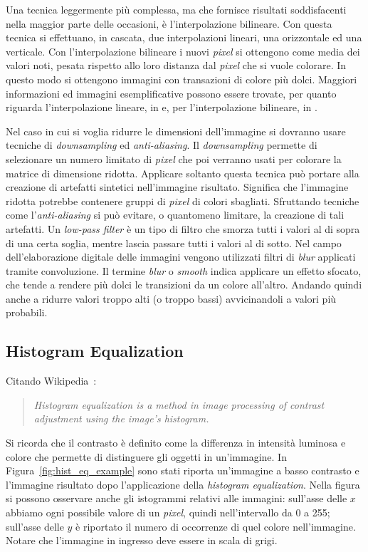 Una tecnica leggermente più complessa, ma che fornisce risultati soddisfacenti nella maggior parte delle occasioni, è l'interpolazione bilineare.
Con questa tecnica si effettuano, in cascata, due interpolazioni lineari, una orizzontale ed una verticale.
Con l'interpolazione bilineare i nuovi \textit{pixel} si ottengono come media dei valori noti, pesata rispetto allo loro distanza dal \textit{pixel} che si vuole colorare.
In questo modo si ottengono immagini con transazioni di colore più dolci.
Maggiori informazioni ed immagini esemplificative possono essere trovate, per quanto riguarda l'interpolazione lineare, in \cite{linear-interpolation} e, per l'interpolazione bilineare, in \cite{bilinear-interpolation}.

Nel caso in cui si voglia ridurre le dimensioni dell'immagine si dovranno usare tecniche di \textit{downsampling} ed \textit{anti-aliasing}.
Il \textit{downsampling} permette di selezionare un numero limitato di \textit{pixel} che poi verranno usati per colorare la matrice di dimensione ridotta.
Applicare soltanto questa tecnica può portare alla creazione di artefatti sintetici nell'immagine risultato.
Significa che l'immagine ridotta potrebbe contenere gruppi di \textit{pixel} di colori sbagliati.
Sfruttando tecniche come l'\textit{anti-aliasing} si può evitare, o quantomeno limitare, la creazione di tali artefatti.
Un \textit{low-pass filter} è un tipo di filtro che smorza tutti i valori al di sopra di una certa soglia, mentre lascia passare tutti i valori al di sotto.
Nel campo dell'elaborazione digitale delle immagini vengono utilizzati filtri di \textit{blur} applicati tramite convoluzione.
Il termine \textit{blur} o \textit{smooth} indica applicare un effetto sfocato, che tende a rendere più dolci le transizioni da un colore all'altro.
Andando quindi anche a ridurre valori troppo alti (o troppo bassi) avvicinandoli a valori più probabili.


\clearpage
\subsection {Histogram Equalization}
Citando Wikipedia~\cite{wikipedia-hist-eq}:
\begin{quote}
  \textit{Histogram equalization is a method in image processing of contrast adjustment using the image's histogram.}
\end{quote}
Si ricorda che il contrasto è definito come la differenza in intensità luminosa e colore che permette di distinguere gli oggetti in un'immagine.
In Figura~\ref{fig:hist_eq_example} sono stati riporta un'immagine a basso contrasto e l'immagine risultato dopo l'applicazione della \textit{histogram equalization}.
Nella figura si possono osservare anche gli istogrammi relativi alle immagini: sull'asse delle $x$ abbiamo ogni possibile valore di un \textit{pixel}, quindi nell'intervallo da 0 a 255; sull'asse delle $y$ è riportato il numero di occorrenze di quel colore nell'immagine.
Notare che l'immagine in ingresso deve essere in scala di grigi.

